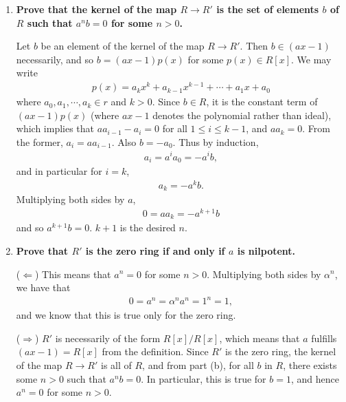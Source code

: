 \documentclass[a4paper,12pt]{article}
\begin{document}
\begin{enumerate}
\begin{enumerate}
            \item
                \boldmath
                \textbf{Prove that the kernel of the map $R \to R'$ is the set of elements $b$ of $R$ such that $a^n b = 0$ for some $n > 0$.} \par
                \unboldmath
                Let $b$ be an element of the kernel of the map $R \to R'$. Then $b \in (ax - 1)$ necessarily, and so $b = (ax - 1) p(x)$ for some $p(x) \in R[x]$. We may write
                \begin{align*}
                    p(x) = a_k x^k + a_{k - 1} x^{k - 1} + \cdots + a_1 x + a_0
                \end{align*}
                where $a_0, a_1, \cdots, a_k \in r$ and $k > 0$. Since $b \in R$, it is the constant term of $(ax - 1) p(x)$ (where $ax - 1$ denotes the polynomial rather than ideal), which implies that $a a_{i - 1} - a_i = 0$ for all $1 \leq i \leq k - 1$, and $a a_k = 0$. From the former, $a_i = a a_{i - 1}$. Also $b = -a_0$. Thus by induction,
                \begin{align*}
                    a_i = a^i a_0 = -a^i b,
                \end{align*}
                and in particular for $i = k$,
                \begin{align*}
                    a_k = -a^k b.
                \end{align*}
                Multiplying both sides by $a$,
                \begin{align*}
                    0 = a a_k = -a^{k + 1} b
                \end{align*}
                and so $a^{k + 1} b = 0$. $k + 1$ is the desired $n$.

            \item
                \boldmath
                \textbf{Prove that $R'$ is the zero ring if and only if $a$ is nilpotent.} \par
                \unboldmath
                ($\Leftarrow$) This means that $a^n = 0$ for some $n > 0$. Multiplying both sides by $\alpha^n$, we have that
                \begin{align*}
                    0 = a^n = \alpha^n a^n = 1^n = 1,
                \end{align*}
                and we know that this is true only for the zero ring. \par
                ($\Rightarrow$) $R'$ is necessarily of the form $R[x]/R[x]$, which means that $a$ fulfills $(ax - 1) = R[x]$ from the definition. Since $R'$ is the zero ring, the kernel of the map $R \to R'$ is all of $R$, and from part (b), for all $b$ in $R$, there exists some $n > 0$ such that $a^n b = 0$. In particular, this is true for $b = 1$, and hence $a^n = 0$ for some $n > 0$.
        \end{enumerate}
\end{enumerate}
\end{document}
